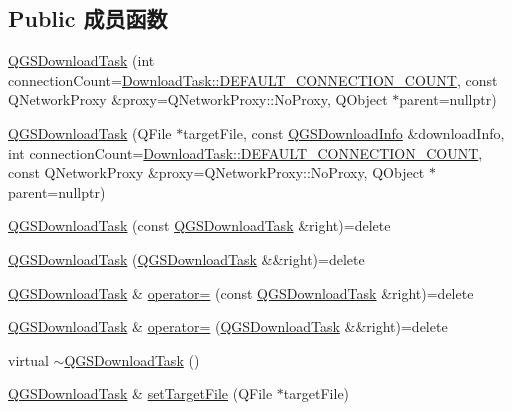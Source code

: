 \subsection*{Public 成员函数}
\begin{DoxyCompactItemize}
\item 
\mbox{\hyperlink{class_q_g_s_download_task_a8d262ffea2148219ec2371bb7d77b2c1}{Q\+G\+S\+Download\+Task}} (int connection\+Count=\mbox{\hyperlink{namespace_download_task_aaa57d3178f399d1c5ba47d41cd38bb8e}{Download\+Task\+::\+D\+E\+F\+A\+U\+L\+T\+\_\+\+C\+O\+N\+N\+E\+C\+T\+I\+O\+N\+\_\+\+C\+O\+U\+NT}}, const Q\+Network\+Proxy \&proxy=Q\+Network\+Proxy\+::\+No\+Proxy, Q\+Object $\ast$parent=nullptr)
\item 
\mbox{\hyperlink{class_q_g_s_download_task_a96d9eba8d47e0087506a9873b342187e}{Q\+G\+S\+Download\+Task}} (Q\+File $\ast$target\+File, const \mbox{\hyperlink{class_q_g_s_download_info}{Q\+G\+S\+Download\+Info}} \&download\+Info, int connection\+Count=\mbox{\hyperlink{namespace_download_task_aaa57d3178f399d1c5ba47d41cd38bb8e}{Download\+Task\+::\+D\+E\+F\+A\+U\+L\+T\+\_\+\+C\+O\+N\+N\+E\+C\+T\+I\+O\+N\+\_\+\+C\+O\+U\+NT}}, const Q\+Network\+Proxy \&proxy=Q\+Network\+Proxy\+::\+No\+Proxy, Q\+Object $\ast$parent=nullptr)
\item 
\mbox{\hyperlink{class_q_g_s_download_task_aa01677c7af9669e07ccb12bd91654947}{Q\+G\+S\+Download\+Task}} (const \mbox{\hyperlink{class_q_g_s_download_task}{Q\+G\+S\+Download\+Task}} \&right)=delete
\item 
\mbox{\hyperlink{class_q_g_s_download_task_a095ed01a4cdc1ac9cb1db6ca572d839c}{Q\+G\+S\+Download\+Task}} (\mbox{\hyperlink{class_q_g_s_download_task}{Q\+G\+S\+Download\+Task}} \&\&right)=delete
\item 
\mbox{\hyperlink{class_q_g_s_download_task}{Q\+G\+S\+Download\+Task}} \& \mbox{\hyperlink{class_q_g_s_download_task_ad93764847291d6e3f23d7d26b4798de8}{operator=}} (const \mbox{\hyperlink{class_q_g_s_download_task}{Q\+G\+S\+Download\+Task}} \&right)=delete
\item 
\mbox{\hyperlink{class_q_g_s_download_task}{Q\+G\+S\+Download\+Task}} \& \mbox{\hyperlink{class_q_g_s_download_task_a97a226091a8759b848b3fc7754a52f38}{operator=}} (\mbox{\hyperlink{class_q_g_s_download_task}{Q\+G\+S\+Download\+Task}} \&\&right)=delete
\item 
virtual \mbox{\hyperlink{class_q_g_s_download_task_abe196b5c26896f9c162a3047ceb9dc4a}{$\sim$\+Q\+G\+S\+Download\+Task}} ()
\item 
\mbox{\hyperlink{class_q_g_s_download_task}{Q\+G\+S\+Download\+Task}} \& \mbox{\hyperlink{class_q_g_s_download_task_adb916bb711a3c98c9b20785874c48a46}{set\+Target\+File}} (Q\+File $\ast$target\+File)

\end{DoxyCompactItemize}
